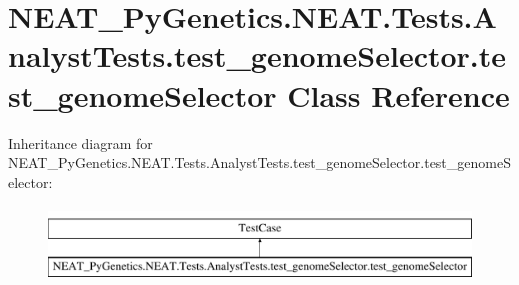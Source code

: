 \hypertarget{class_n_e_a_t___py_genetics_1_1_n_e_a_t_1_1_tests_1_1_analyst_tests_1_1test__genome_selector_1_1test__genome_selector}{}\section{N\+E\+A\+T\+\_\+\+Py\+Genetics.\+N\+E\+A\+T.\+Tests.\+Analyst\+Tests.\+test\+\_\+genome\+Selector.\+test\+\_\+genome\+Selector Class Reference}
\label{class_n_e_a_t___py_genetics_1_1_n_e_a_t_1_1_tests_1_1_analyst_tests_1_1test__genome_selector_1_1test__genome_selector}
Inheritance diagram for N\+E\+A\+T\+\_\+\+Py\+Genetics.\+N\+E\+A\+T.\+Tests.\+Analyst\+Tests.\+test\+\_\+genome\+Selector.\+test\+\_\+genome\+Selector\+:\begin{figure}[H]
\begin{center}
\leavevmode
\includegraphics[height=2.000000cm]{class_n_e_a_t___py_genetics_1_1_n_e_a_t_1_1_tests_1_1_analyst_tests_1_1test__genome_selector_1_1test__genome_selector}
\end{center}
\end{figure}
